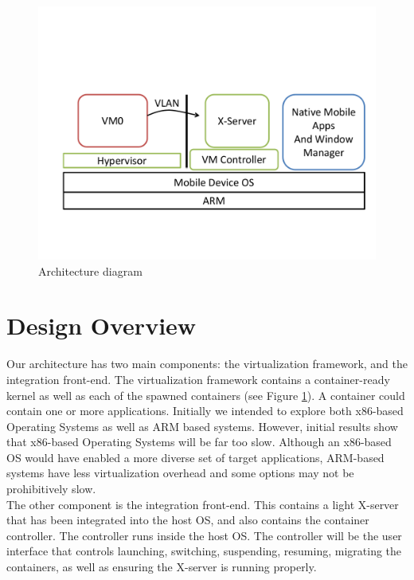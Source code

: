 \begin{figure}[bth]
\centering
\includegraphics[width=1.5\columnwidth]{arch}
\caption{Architecture diagram}
\label{fig:arch}
\end{figure}

\section{Design Overview}
\label{sec:overview}

\label{sec:proposedarch}
Our architecture has two main components: the virtualization framework, and the integration front-end.  The virtualization framework contains a container-ready kernel as well as each of the spawned containers (see Figure \ref{fig:arch}).  A container could contain one or more applications.  Initially we intended to explore both x86-based Operating Systems as well as ARM based systems.  However, initial results show that x86-based Operating Systems will be far too slow.  Although an x86-based OS would have enabled a more diverse set of target applications, ARM-based systems have less virtualization overhead and some options may not be prohibitively slow. \\

The other component is the integration front-end. This contains a light X-server that has been integrated into the host OS, and also contains the container controller. The controller runs inside the host OS. The controller will be the user interface that controls launching, switching, suspending, resuming, migrating the containers, as well as ensuring the X-server is running properly. \\


